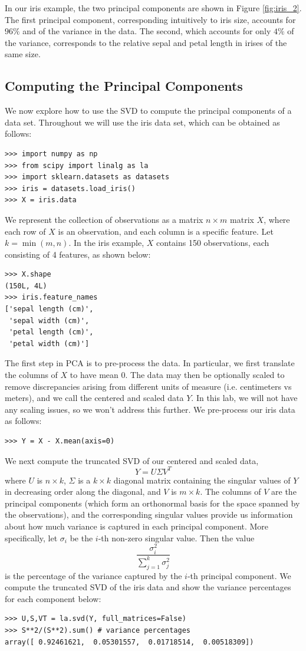 In our iris example, the two principal components are shown in Figure \ref{fig:iris_2}. The first principal component, corresponding intuitively to iris size, accounts for $96\%$ and of the variance in the data. The second, which accounts for only $4\%$ of the variance, corresponds to the relative sepal and petal length in irises of the same size.

\subsection*{Computing the Principal Components}
We now explore how to use the SVD to compute the principal components of a data set.
Throughout we will use the iris data set, which can be obtained as follows:
\begin{lstlisting}
>>> import numpy as np
>>> from scipy import linalg as la
>>> import sklearn.datasets as datasets
>>> iris = datasets.load_iris()
>>> X = iris.data
\end{lstlisting}
We represent the collection of observations as a matrix $n \times m$ matrix $X$, where each row of $X$ is an observation, and each column is a specific feature.
Let $k = \min(m,n)$.
In the iris example, $X$ contains 150 observations, each consisting of 4 features, as shown below:
\begin{lstlisting}
>>> X.shape
(150L, 4L)
>>> iris.feature_names
['sepal length (cm)',
 'sepal width (cm)',
 'petal length (cm)',
 'petal width (cm)']
\end{lstlisting}

The first step in PCA is to pre-process the data. In particular, we first translate the columns of $X$ to have mean 0.
The data may then be optionally scaled to remove discrepancies arising from different units of measure (i.e. centimeters vs meters), and we call the centered and scaled data $Y$.
In this lab, we will not have any scaling issues, so we won't address this further.
We pre-process our iris data as follows:
\begin{lstlisting}
>>> Y = X - X.mean(axis=0)
\end{lstlisting}

We next compute the truncated SVD of our centered and scaled data,
\[Y = U\Sigma V^{T}\]
where $U$ is $n \times k$, $\Sigma$ is a $k\times k$ diagonal matrix containing the singular values of $Y$ in decreasing order along the diagonal, and $V$ is $m \times k$. The columns of $V$ are the principal components (which form an orthonormal basis for the space spanned by the observations), and the corresponding singular values provide us information about how much variance is captured in each principal component. More specifically, let $\sigma_{i}$ be the $i$-th non-zero singular value. Then the value
\[\frac{\sigma^2_{i}}{\sum_{j=1}^{k} \sigma^2_{j}}\]
is the percentage of the variance captured by the $i$-th principal component.
We compute the truncated SVD of the iris data and show the variance percentages for each component below:
\begin{lstlisting}
>>> U,S,VT = la.svd(Y, full_matrices=False)
>>> S**2/(S**2).sum() # variance percentages
array([ 0.92461621,  0.05301557,  0.01718514,  0.00518309])
\end{lstlisting}

